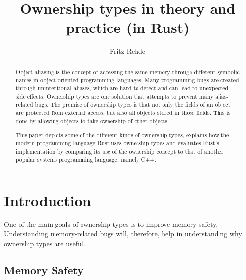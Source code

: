 \documentclass[sigplan,11pt,nonacm]{acmart}
\begin{document}
\title{Ownership types in theory and practice (in Rust)}
\author{Fritz Rehde}



\begin{abstract}

Object aliasing is the concept of accessing the same memory through different symbolic names in object-oriented programming languages.
Many programming bugs are created through unintentional aliases, which are hard to detect and can lead to unexpected side effects.
Ownership types are one solution that attempts to prevent many alias-related bugs.
The premise of ownership types is that not only the fields of an object are protected from external access, but also all objects stored in those fields.
This is done by allowing objects to take ownership of other objects.

This paper depicts some of the different kinds of ownership types, explains how the modern programming language Rust uses ownership types and evaluates Rust's implementation by comparing its use of the ownership concept to that of another popular systems programming language, namely C++.

\end{abstract}


\maketitle


\section{Introduction}
\label{sec:introduction}

One of the main goals of ownership types is to improve memory safety.
Understanding memory-related bugs will, therefore, help in understanding why ownership types are useful.


\subsection{Memory Safety}
\label{sec:memory-safety}
\end{document}
